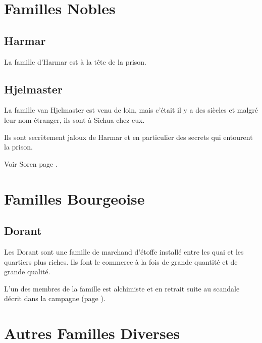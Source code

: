 \section{Familles Nobles}

\subsection*{Harmar}
La famille d'Harmar est à la tête de la prison.

\subsection*{Hjelmaster}

La famille van Hjelmaster est venu de loin, mais c'était il y a des 
siècles et malgré leur nom étranger, ils sont à Sichua chez eux.

Ils sont secrètement jaloux de Harmar et en particulier des secrets
qui entourent la prison.

Voir Soren page \pageref{SorenVH}.

\section{Familles Bourgeoise}

\subsection*{Dorant}

Les Dorant sont une famille de marchand d'étoffe installé entre les quai et
les quartiers plus riches. Ils font le commerce à la fois de grande 
quantité et de grande qualité. 

L'un des membres de la famille est alchimiste et en retrait suite au 
scandale décrit dans la campagne (page \pageref{TAS-Magie}).

\section{Autres Familles Diverses}


